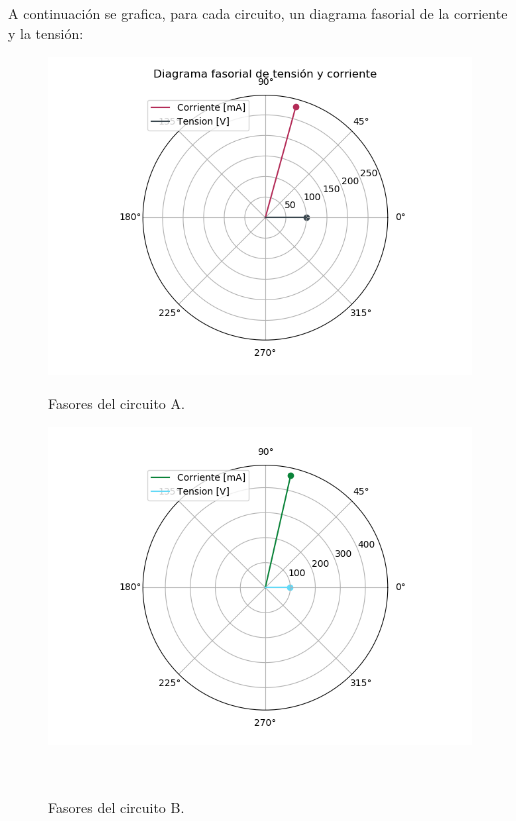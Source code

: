 \documentclass[a4paper]{article}
\begin{document}
A continuación se grafica, para cada circuito, un diagrama fasorial de la corriente y la tensión:

\begin{figure}[H]
\centering
\begin{minipage}{.5\textwidth}
	\centering
	\includegraphics[width=1.2\linewidth]{Fasorial-1A.png}
	\caption{Fasores del circuito A.}
	\label{fig:faso-1a}
\end{minipage}
\begin{minipage}{.5\textwidth}
	\centering
	\includegraphics[width=1.2\linewidth]{Fasorial-1B.png}
	\caption{Fasores del circuito B.}
	\label{fig:faso-1b}
\end{minipage}\\
\end{figure}
\end{document}
